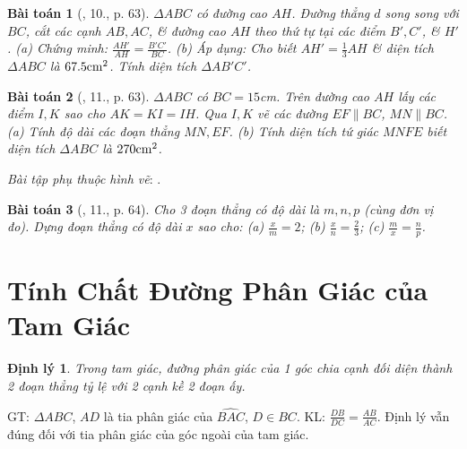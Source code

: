 \documentclass{article}
\newtheorem{baitoan}{Bài toán}
\newtheorem{dinhly}{Định lý}
\begin{document}
\begin{baitoan}[\cite{SGK_Toan_8_tap_2}, 10., p. 63]
	$\Delta ABC$ có đường cao $AH$. Đường thẳng $d$ song song với $BC$, cắt các cạnh $AB,AC$, \& đường cao $AH$ theo thứ tự tại các điểm $B',C'$, \& $H'$. (a) Chứng minh: $\frac{AH'}{AH} = \frac{B'C'}{BC}$. (b) Áp dụng: Cho biết $AH' = \frac{1}{3}AH$ \& diện tích $\Delta ABC$ là $67.5{\rm cm}^2$. Tính diện tích $\Delta AB'C'$.
\end{baitoan}

\begin{baitoan}[\cite{SGK_Toan_8_tap_2}, 11., p. 63]
	$\Delta ABC$ có $BC = 15$\emph{cm}. Trên đường cao $AH$ lấy các điểm $I,K$ sao cho $AK = KI = IH$. Qua $I,K$ vẽ các đường $EF\parallel BC$, $MN\parallel BC$. (a) Tính độ dài các đoạn thẳng $MN,EF$. (b) Tính diện tích tứ giác $MNFE$ biết diện tích $\Delta ABC$ là $270{\rm cm}^2$.
\end{baitoan}
\noindent\textit{Bài tập phụ thuộc hình vẽ}: \cite[12.--13., p. 64]{SGK_Toan_8_tap_2}.

\begin{baitoan}[\cite{SGK_Toan_8_tap_2}, 11., p. 64]
	Cho 3 đoạn thẳng có độ dài là $m,n,p$ (cùng đơn vị đo). Dựng đoạn thẳng có độ dài $x$ sao cho: (a) $\frac{x}{m} = 2$; (b) $\frac{x}{n} = \frac{2}{3}$; (c) $\frac{m}{x} = \frac{n}{p}$.
\end{baitoan}


\section{Tính Chất Đường Phân Giác của Tam Giác}

\begin{dinhly}
	Trong tam giác, đường phân giác của 1 góc chia cạnh đối diện thành 2 đoạn thẳng tỷ lệ với 2 cạnh kề 2 đoạn ấy.
\end{dinhly}
GT: $\Delta ABC$, $AD$ là tia phân giác của $\widehat{BAC}$, $D\in BC$. KL: $\frac{DB}{DC} = \frac{AB}{AC}$. Định lý vẫn đúng đối với tia phân giác của  góc ngoài của tam giác.
\end{document}
